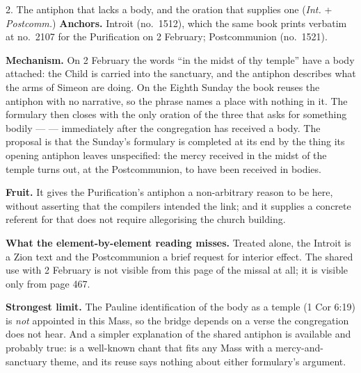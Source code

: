 \begin{proposal}{2. The antiphon that lacks a body, and the oration that supplies
one \normalfont(\emph{Int.} + \emph{Postcomm.})}
\textbf{Anchors.} Introit  (no.\ 1512), which the
same book prints verbatim at no.\ 2107 for the Purification on 2 February;
Postcommunion  (no.\ 1521).

\textbf{Mechanism.} On 2 February the words ``in the midst of thy temple'' have
a body attached: the Child is carried into the sanctuary, and the antiphon
describes what the arms of Simeon are doing. On the Eighth Sunday the book
reuses the antiphon with no narrative, so the phrase names a place with nothing
in it. The formulary then closes with the only oration of the three that asks
for something bodily ---  --- immediately
after the congregation has received a body. The proposal is that the Sunday's
formulary is completed at its end by the thing its opening antiphon leaves
unspecified: the mercy received in the midst of the temple turns out, at the
Postcommunion, to have been received in bodies.

\textbf{Fruit.} It gives the Purification's antiphon a non-arbitrary reason to
be here, without asserting that the compilers intended the link; and it supplies
a concrete referent for  that does not require allegorising the
church building.

\textbf{What the element-by-element reading misses.} Treated alone, the Introit
is a Zion text and the Postcommunion a brief request for interior effect. The
shared use with 2 February is not visible from this page of the missal at all;
it is visible only from page 467.

\textbf{Strongest limit.} The Pauline identification of the body as a temple
(1 Cor 6:19) is \emph{not} appointed in this Mass, so the bridge depends on a
verse the congregation does not hear. And a simpler explanation of the shared
antiphon is available and probably true:  is a well-known
chant that fits any Mass with a mercy-and-sanctuary theme, and its reuse says
nothing about either formulary's argument.
\end{proposal}

